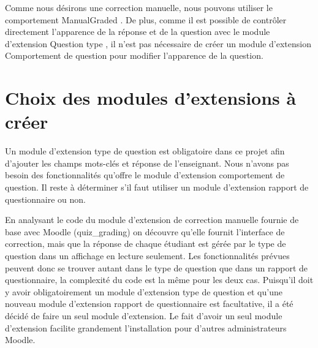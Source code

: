 Comme nous désirons une correction manuelle, nous pouvons utiliser le comportement \og ManualGraded \fg{}.
De plus, comme il est possible de contrôler directement l'apparence de la réponse et de la question avec le module d'extension \og Question type \fg{}, il n'est pas nécessaire de créer un module d'extension \og Comportement de question \fg{} pour modifier l'apparence de la question.

\section{Choix des modules d'extensions à créer}

Un module d'extension type de question est obligatoire dans ce projet afin d'ajouter les champs mots-clés et réponse de l'enseignant.
Nous n'avons pas besoin des fonctionnalités qu'offre le module d'extension comportement de question.
Il reste à déterminer s'il faut utiliser un module d'extension rapport de questionnaire ou non.

En analysant le code du module d'extension de correction manuelle fournie de base avec Moodle (quiz\_grading) on découvre qu'elle fournit l'interface de correction, mais que la réponse de chaque étudiant est gérée par le type de question dans un affichage en lecture seulement.
Les fonctionnalités prévues peuvent donc se trouver autant dans le type de question que dans un rapport de questionnaire, la complexité du code est la même pour les deux cas.
Puisqu'il doit y avoir obligatoirement un module d'extension type de question et qu'une nouveau module d'extension rapport de questionnaire est facultative, il a été décidé de faire un seul module d'extension.
Le fait d'avoir un seul module d'extension facilite grandement l'installation pour d'autres administrateurs Moodle.